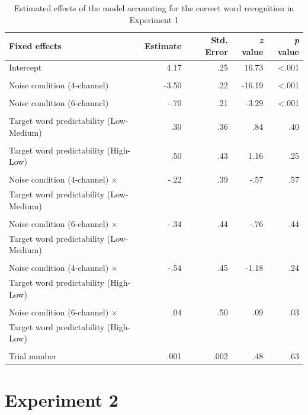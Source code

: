 \documentclass[a4paper, nobind]{templates/ociamthesis}
\begin{document}
\begin{table}[ht]
\begin{center}
\caption{Estimated effects of the model accounting for the correct word recognition in Experiment 1}
\label{results1a} 
\vskip 0.12in
\begin{tabular}[]{@{}lrrrr@{}}
\toprule
Fixed effects & Estimate & Std. Error & \emph{z} value & \emph{p}
value \\
\midrule
Intercept & 4.17 & .25 & 16.73 & \textless.001 \\
\\
Noise condition (4-channel) & -3.50 & .22 & -16.19 & \textless.001 \\
\\
Noise condition (6-channel) & -.70 & .21 & -3.29 & \textless.001 \\
\\
Target word predictability (Low-Medium) & .30 & .36 & .84 & .40 \\
\\
Target word predictability (High-Low) & .50 & .43 & 1.16 & .25 \\
\\
Noise condition (4-channel) $\times$ & -.22 & .39 & -.57 & .57 \\
Target word predictability (Low-Medium) \\
\\
Noise condition (6-channel) $\times$ & -.34 & .44 & -.76 & .44 \\
Target word predictability (Low-Medium) \\
\\
Noise condition (4-channel) $\times$ & -.54 & .45 & -1.18 & .24 \\
Target word predictability (High-Low) \\
\\
Noise condition (6-channel) $\times$ & .04 & .50 & .09 & .03 \\
Target word predictability (High-Low) \\
\\
Trial number & .001 & .002 & .48 & .63 \\
\bottomrule
\end{tabular} 
\end{center} 
\end{table}

\hypertarget{experiment1b}{%
\section{Experiment 2}\label{experiment1b}}
\end{document}
